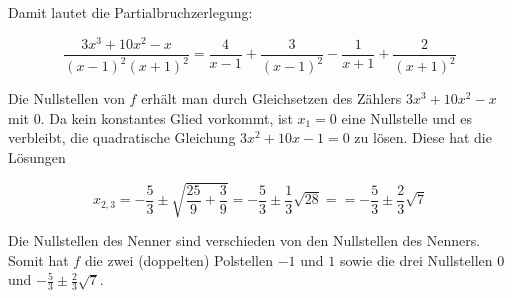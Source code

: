 Damit lautet die Partialbruchzerlegung:

$$
	\frac{3x^3+10x^2-x}{(x-1)^2(x+1)^2} = \frac{4}{x-1} + \frac{3}{(x-1)^2} - \frac{1}{x+1} + \frac{2}{(x+1)^2}
$$

Die Nullstellen von $f$ erhält man durch Gleichsetzen des Zählers $3x^3+10x^2-x$ mit $0$. Da kein konstantes Glied vorkommt, ist $x_1=0$ eine Nullstelle und es verbleibt, die quadratische Gleichung $3x^2+10x-1=0$ zu lösen. Diese hat die Lösungen

$$
	x_{2,3} = -\frac{5}{3} \pm \sqrt{\frac{25}{9}+\frac{3}{9}} = -\frac{5}{3} \pm \frac{1}{3}\sqrt{28} = = -\frac{5}{3} \pm \frac{2}{3}\sqrt{7}
$$

Die Nullstellen des Nenner sind verschieden von den Nullstellen des Nenners. Somit hat $f$ die zwei (doppelten) Polstellen $-1$ und $1$ sowie die drei Nullstellen $0$ und $-\frac{5}{3} \pm \frac{2}{3}\sqrt{7}$.
